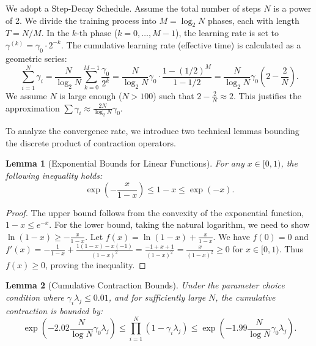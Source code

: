\documentclass{article}
\theoremstyle{definition}
\theoremstyle{definition}
\theoremstyle{plain}
\theoremstyle{plain}
\theoremstyle{plain}
\newtheorem{lemma}{Lemma}
\theoremstyle{plain}
\theoremstyle{plain}
\begin{document}
We adopt a Step-Decay Schedule. Assume the total number of steps $N$ is a power of 2. We divide the training process into $M = \log_2 N$ phases, each with length $T = N/M$. In the $k$-th phase ($k=0,\dots,M-1$), the learning rate is set to $\gamma^{(k)} = \gamma_0 \cdot 2^{-k}$.
The cumulative learning rate (effective time) is calculated as a geometric series:
\begin{equation}
    \sum_{i=1}^N\gamma_i = \frac{N}{\log_2 N} \sum_{k=0}^{M-1} \frac{\gamma_0}{2^k} = \frac{N}{\log_2 N}\gamma_0 \cdot \frac{1-(1/2)^M}{1-1/2} = \frac{N}{\log_2 N}\gamma_0 \left(2-\frac{2}{N}\right).
\end{equation}
We assume $N$ is large enough ($N > 100$) such that $2 - \frac{2}{N} \approx 2$. This justifies the approximation $\sum \gamma_i \approx \frac{2N}{\log_2 N}\gamma_0$.

To analyze the convergence rate, we introduce two technical lemmas bounding the discrete product of contraction operators.

\begin{lemma}[Exponential Bounds for Linear Functions]
    \label{lemma:exp_linear_bound}
    For any $x \in [0, 1)$, the following inequality holds:
    \[ \exp\left(-\frac{x}{1-x}\right)\leq 1-x \leq \exp\left(-x\right). \]
\end{lemma}
\begin{proof}
    The upper bound follows from the convexity of the exponential function, $1-x \le e^{-x}$.
    For the lower bound, taking the natural logarithm, we need to show $\ln(1-x) \ge -\frac{x}{1-x}$. Let $f(x) = \ln(1-x) + \frac{x}{1-x}$. We have $f(0)=0$ and $f'(x) = -\frac{1}{1-x} + \frac{1(1-x) - x(-1)}{(1-x)^2} = \frac{-1+x+1}{(1-x)^2} = \frac{x}{(1-x)^2} \ge 0$ for $x \in [0, 1)$. Thus $f(x) \ge 0$, proving the inequality.
\end{proof}

\begin{lemma}[Cumulative Contraction Bounds]
    \label{lemma:product_contraction}
    Under the parameter choice condition where $\gamma_i \lambda_j \le 0.01$, and for sufficiently large $N$, the cumulative contraction is bounded by:
    \begin{equation}
        \exp\left(-2.02\frac{N}{\log N}\gamma_0\lambda_j\right) \leq \prod_{i=1}^{N}(1-\gamma_i\lambda_j) \leq \exp\left(-1.99\frac{N}{\log N}\gamma_0\lambda_j\right).
    \end{equation}
\end{lemma}
\end{document}
